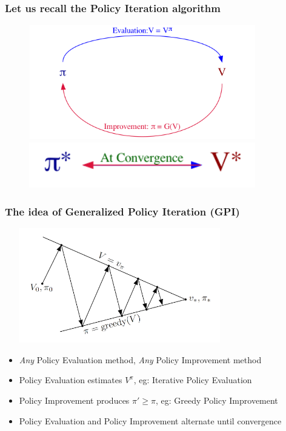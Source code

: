 \documentclass[handout]{beamer}
\begin{document}
\begin{frame}
\frametitle{Let us recall the Policy Iteration algorithm}
\includegraphics[width=12cm, height=5cm]{policy_iteration_loop.png}
\includegraphics[width=12cm, height=2cm]{policy_iteration_convergence.png}
\end{frame}

\begin{frame}
\frametitle{The idea of Generalized Policy Iteration (GPI)}
\includegraphics[width=10cm, height=5cm]{vf_policy_intersecting_lines.png}
\pause
\begin{itemize}[<+->]
\item {\em Any} Policy Evaluation method, {\em Any} Policy Improvement method
\item Policy Evaluation estimates $V^{\pi}$, eg: Iterative Policy Evaluation
\item Policy Improvement produces $\pi' \geq \pi$, eg: Greedy Policy Improvement
\item Policy Evaluation and Policy Improvement alternate until convergence
\end{itemize}
\end{frame}
\end{document}
